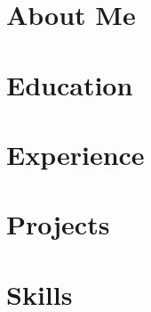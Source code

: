 \documentclass[12pt, letterpaper, titlepage]{article}
\begin{document}
{\centering {\scshape\LARGE \name\ \par}}

\section{About Me}
\section{Education}
\section{Experience}
\section{Projects}
\section{Skills}
\end{document}
